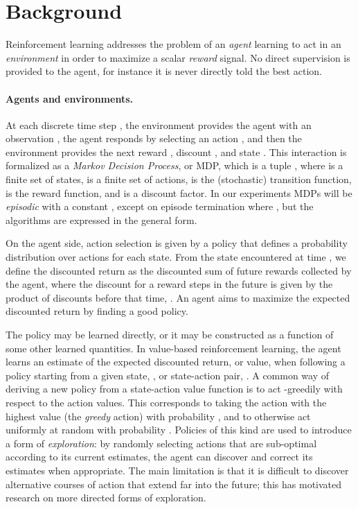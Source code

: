 \documentclass[letterpaper]{article} \usepackage{aaai18}  \usepackage{times}  \usepackage{helvet}  \usepackage{courier}  \usepackage{url}  \usepackage{graphicx}  \usepackage{amsmath,amssymb}
\begin{document}
\section{Background}
Reinforcement learning addresses the problem of an \textit{agent} learning to act in an \textit{environment} in order to maximize a scalar \textit{reward} signal. No direct supervision is provided to the agent, for instance it is never directly told the best action. 

\paragraph{Agents and environments.}
At each discrete time step , the environment provides the agent with an observation , the agent responds by selecting an action , and then the environment provides the next reward , discount , and state .
This interaction is formalized as a {\em Markov Decision Process}, or MDP,  which is a tuple , where  is a finite set of states,  is a finite set of actions,  is the (stochastic) transition function,  is the reward function, and  is a discount factor. In our experiments MDPs will be \textit{episodic} with a constant , except on episode termination where , but the algorithms are expressed in the general form.

On the agent side, action selection is given by a policy  that defines a probability distribution over actions for each state. From the state  encountered at time , we define the discounted return  as the discounted sum of future rewards collected by the agent, where the discount for a reward  steps in the future is given by the product of discounts before that time, . An agent aims to maximize the expected discounted return by finding a good policy. 

The policy may be learned directly, or it may be constructed as a function of some other learned quantities. In value-based reinforcement learning, the agent learns an estimate of the expected discounted return, or value, when following a policy  starting from a given state, , or state-action pair, . A common way of deriving a new policy from a state-action value function is to act -greedily with respect to the action values. This corresponds to taking the action with the highest value (the \textit{greedy} action) with probability , and to otherwise act uniformly at random with probability . Policies of this kind are used to introduce a form of \textit{exploration}: by randomly selecting actions that are sub-optimal according to its current estimates, the agent can discover and correct its estimates when appropriate. The main limitation is that it is difficult to discover alternative courses of action that extend far into the future; this has motivated research on more directed forms of exploration.
\end{document}
